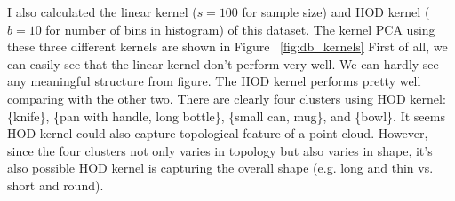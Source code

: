 \documentclass[10pt]{article}
\begin{document}
I also calculated the linear kernel ($s = 100$ for sample size) and HOD kernel ($b=10$ for number of bins in histogram) of this dataset.
The kernel PCA using these three different kernels are shown in Figure ~\ref{fig:db_kernels}
First of all, we can easily see that the linear kernel don't perform very well.
We can hardly see any meaningful structure from figure.
The HOD kernel performs pretty well comparing with the other two.
There are clearly four clusters using HOD kernel: \{knife\}, \{pan with handle, long bottle\}, \{small can, mug\}, and \{bowl\}.
It seems HOD kernel could also capture topological feature of a point cloud.
However, since the four clusters not only varies in topology but also varies in shape,
it's also possible HOD kernel is capturing the overall shape (e.g. long and thin vs. short and round).
\end{document}
